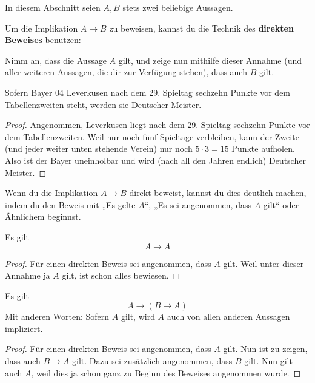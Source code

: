 In diesem Abschnitt seien $A,B$ stets zwei beliebige Aussagen.


\begin{axiom} \label{direkterbeweis} 
    Um die Implikation $A\to B$ zu beweisen, kannst du die Technik des \textbf{direkten Beweises} benutzen:
    
    Nimm an, dass die Aussage $A$ gilt, und zeige nun mithilfe dieser Annahme (und aller weiteren Aussagen, die dir zur Verfügung stehen), dass auch $B$ gilt.
\end{axiom}


\begin{bsp}
    Sofern Bayer 04 Leverkusen nach dem 29. Spieltag sechzehn Punkte vor dem Tabellenzweiten steht, werden sie Deutscher Meister.
\end{bsp}
\begin{proof}
    Angenommen, Leverkusen liegt nach dem 29. Spieltag sechzehn Punkte vor dem Tabellenzweiten. Weil nur noch fünf Spieltage verbleiben, kann der Zweite (und jeder weiter unten stehende Verein) nur noch $5\cdot 3=15$ Punkte aufholen. Also ist der Bayer uneinholbar und wird (nach all den Jahren endlich) Deutscher Meister.
\end{proof}
  
  
\begin{bem}[Signalwörter]
    Wenn du die Implikation $A\to B$ direkt beweist, kannst du dies deutlich machen, indem du den Beweis mit „Es gelte $A$“, „Es sei angenommen, dass $A$ gilt“ oder Ähnlichem beginnst.
\end{bem}

  
\begin{satz} \label{implikationref}
    Es gilt
    \[ A\to A \]
\end{satz}
\begin{proof}
    Für einen direkten Beweis sei angenommen, dass $A$ gilt. Weil unter dieser Annahme ja $A$ gilt, ist schon alles bewiesen.
\end{proof}

  
\begin{satz}\label{wahresausbeliebigem}
    Es gilt
        \[ A \to (B\to A)   \]
    Mit anderen Worten: Sofern $A$ gilt, wird $A$ auch von allen anderen Aussagen impliziert.
\end{satz}
\begin{proof}
    Für einen direkten Beweis sei angenommen, dass $A$ gilt. Nun ist zu zeigen, dass auch $B\to A$ gilt. Dazu sei zusätzlich angenommen, dass $B$ gilt. Nun gilt auch $A$, weil dies ja schon ganz zu Beginn des Beweises angenommen wurde.
\end{proof}


